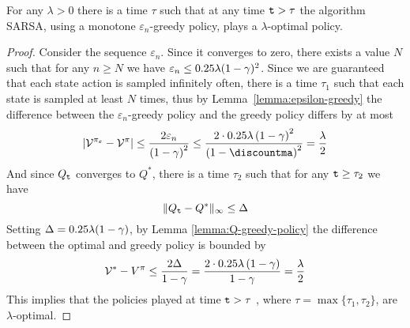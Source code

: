 \begin{theorem}
For any $\lambda>0$ there is a time $\tau$ such that at any time
${\tt t}>\tau$ the algorithm SARSA, using a monotone
$\varepsilon_n$-greedy policy, plays a $\lambda$-optimal policy.
\end{theorem}

\begin{proof}
Consider the sequence $\varepsilon_n$. Since it converges to zero, there exists a value $N$ such that for any $n\geq N$ we have $\varepsilon_n\leq 0.25\lambda(1-\gamma)^2$. Since we are guaranteed that each state action is sampled infinitely often, there is a time $\tau_1$ such that each state is sampled at least $N$ times, thus by Lemma~\ref{lemma:epsilon-greedy} the difference between the $\varepsilon_n$-greedy policy and the greedy policy differs by at most \[\left|\Value^{\pi_{\varepsilon}}-\Value^{\pi}\right|\leq\frac{2\varepsilon_{n}}{\left(1-\discount\right)^{2}}\leq\frac{2\cdot0.25\lambda\left(1-\discount\right)^{2}}{\left(1-\discountma\right)^{2}}=\frac{\lambda}{2}\] 
And since $Q_{\tt t}$ converges to $Q^*$, there is a time $\tau_2$ such that for any ${\tt t}\geq \tau_2$ we have \[\|Q_{\tt t}-Q^*\|_\infty \leq \Delta\] Setting $\Delta = 0.25\lambda (1-\gamma)$, by Lemma \ref{lemma:Q-greedy-policy} the difference between the optimal and greedy policy is bounded by \[\mathcal{V}^{*}-V^{\pi}\leq\frac{2\Delta}{1-\gamma}=\frac{2\cdot0.25\lambda\left(1-\gamma\right)}{1-\gamma}=\frac{\lambda}{2}\] 
This implies that the policies played at time ${\tt t}>\tau$ , where $\tau=\max\{\tau_1,\tau_2\}$, are $\lambda$-optimal.
\end{proof}





